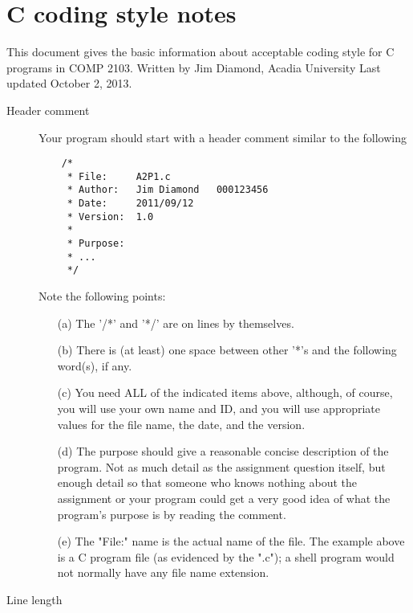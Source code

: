 \chapter{C coding style notes}
\label{chap:C-coding-style-notes}
This document gives the basic information about acceptable coding
style for C programs in COMP 2103.
Written by Jim Diamond, Acadia University
Last updated October 2, 2013.
\begin{description}
\item[Header comment] \hfill

    Your program should start with a header comment similar to the following\:
\begin{verbatim}
    /*
     * File:     A2P1.c
     * Author:   Jim Diamond   000123456
     * Date:     2011/09/12
     * Version:  1.0
     *
     * Purpose:
     * ...
     */
\end{verbatim}
    Note the following points:
    \begin{enumerate}
    \item[(a)] The '/*' and '*/' are on lines by themselves.
    \item[(b)] There is (at least) one space between other '*'s and the
        following word(s), if any.
    \item[(c)] You need ALL of the indicated items above, although, of
        course, you will use your own name and ID, and you will use
        appropriate values for the file name, the date, and the version.
    \item[(d)] The purpose should give a reasonable concise description of
        the program.  Not as much detail as the assignment question
        itself, but enough detail so that someone who knows nothing
        about the assignment or your program could get a very good idea 
        of what the program's purpose is by reading the comment.
    \item[(e)]The "File:" name is the actual name of the file.  The example
        above is a C program file (as evidenced by the ".c");
        a shell program would not normally have any file name extension.
\end{enumerate}

\item[Line length] \hfill


\end{description}
